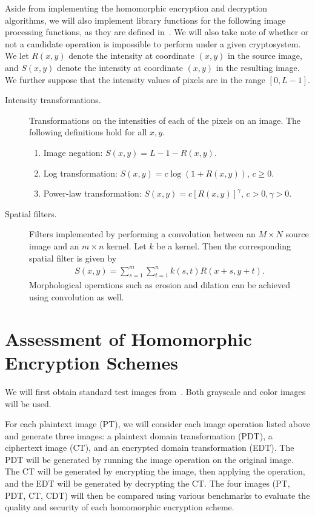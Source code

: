 Aside from implementing the homomorphic encryption and decryption algorithms, we will also implement library functions for the following image processing functions, as they are defined in~\cite{gonzalez_digital_2008}. We will also take note of whether or not a candidate operation is impossible to perform under a given cryptosystem.  We let $R(x,y)$ denote the intensity at coordinate $(x,y)$ in the source image, and $S(x,y)$ denote the intensity at coordinate $(x,y)$ in the resulting image. We further suppose that the intensity values of pixels are in the range $[0, L-1]$.
\begin{description}
	\item[Intensity transformations.] Transformations on the intensities of each of the pixels on an image. The following definitions hold for all $x,y$.
	\begin{enumerate}
		\item Image negation: $S(x,y) = L - 1 - R(x,y)$.
		\item Log transformation: $S(x,y) = c\log{(1 + R(x,y))}$, $c \geq 0$.
		\item Power-law transformation: $S(x,y) = c[R(x,y)]^\gamma$, $c > 0, \gamma > 0$.
	\end{enumerate}
	\item[Spatial filters.] Filters implemented by performing a convolution between an $M\times N$ source image and an $m\times n$ kernel. Let $k$ be a kernel. Then the corresponding spatial filter is given by
	\begin{align}
		S(x,y) = \sum_{s=1}^m{\sum_{t=1}^n{k(s,t)R(x+s,y+t)}}.
	\end{align}
	Morphological operations such as erosion and dilation can be achieved using convolution as well.
\end{description}

\section{Assessment of Homomorphic Encryption Schemes}

We will first obtain standard test images from~\cite{gonzalez_image_nodate}. Both grayscale and color images will be used.

For each plaintext image (PT), we will consider each image operation listed above and generate three images: a plaintext domain transformation (PDT), a ciphertext image (CT), and an encrypted domain transformation (EDT). The PDT will be generated by running the image operation on the original image. The CT will be generated by encrypting the image, then applying the operation, and the EDT will be generated by decrypting the CT. The four images (PT, PDT, CT, CDT) will then be compared using various benchmarks to evaluate the quality and security of each homomorphic encryption scheme.

